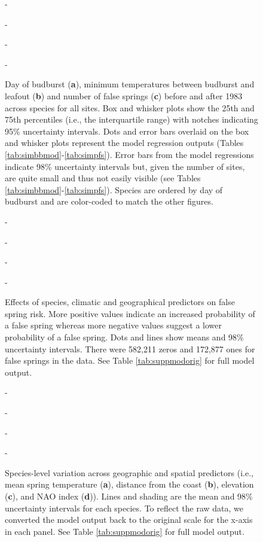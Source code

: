 \documentclass{article}\usepackage[]{graphicx}\usepackage[]{color}
\begin{document}
{\begin{figure} [H]
  -\begin{center}
  -\caption{Day of budburst (\textbf{a}), minimum temperatures between budburst and leafout (\textbf{b}) and number of false springs (\textbf{c}) before and after 1983 across species for all sites. Box and whisker plots show the 25th and 75th percentiles (i.e., the interquartile range) with notches indicating 95\% uncertainty intervals. Dots and error bars overlaid on the box and whisker plots represent the model regression outputs (Tables \ref{tab:simbbmod}-\ref{tab:simpfs}). Error bars from the model regressions indicate 98\% uncertainty intervals but, given the number of sites, are quite small and thus not easily visible (see Tables \ref{tab:simbbmod}-\ref{tab:simpfs}). Species are ordered by day of budburst and are color-coded to match the other figures.  }\label{fig:boxfs}
  -\end{center}
  -\end{figure}}
  
  
{\begin{figure} [H]
  -\begin{center}
  -\caption{Effects of species, climatic and geographical predictors on false spring risk. More positive values indicate an increased probability of a false spring whereas more negative values suggest a lower probability of a false spring. Dots and lines show means and 98\% uncertainty intervals. There were 582,211 zeros and 172,877 ones for false springs in the data. See Table \ref{tab:suppmodorig} for full model output.}\label{fig:maineffects}
  -\end{center}
  -\end{figure}}

  
{\begin{figure} [H]
  -\begin{center}
  -\caption{Species-level variation across geographic and spatial predictors (i.e., mean spring temperature (\textbf{a}), distance from the coast (\textbf{b}), elevation (\textbf{c}), and NAO index (\textbf{d})). Lines and shading are the mean and 98\% uncertainty intervals for each species. To reflect the raw data, we converted the model output back to the original scale for the x-axis in each panel. See Table \ref{tab:suppmodorig} for full model output. }\label{fig:spp}
  -\end{center}
  -\end{figure}}


  
\end{document}
